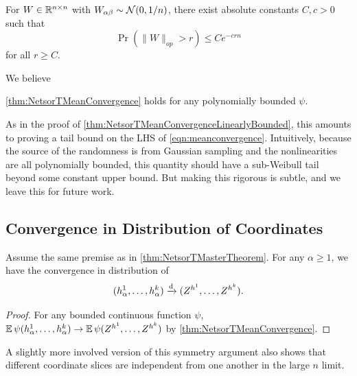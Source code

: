 \documentclass[main.tex]{subfiles}
\begin{document}
\begin{fact}\label{fact:opnormTailBound}
    For $W \in \mathbb{R}^{n \times n}$ with $W_{\alpha\beta}\sim\mathcal{N}(0, 1/n)$, there exist absolute constants $C, c > 0$ such that
    \[\Pr(\|W\|_{op} > r) \le C e^{-crn}\]
    for all $r \ge C$.
\end{fact}

We believe
\begin{conj}\label{conj:NetsorTMeanConvergence}
\cref{thm:NetsorTMeanConvergence} holds for any polynomially bounded $\psi$.
\end{conj}
As in the proof of \cref{thm:NetsorTMeanConvergenceLinearlyBounded}, this amounts to proving a tail bound on the LHS of \cref{eqn:meanconvergence}.
Intuitively, because the source of the randomness is from Gaussian sampling and the nonlinearities are all polynomially bounded, this quantity should have a sub-Weibull tail beyond some constant upper bound.
But making this rigorous is subtle, and we leave this for future work.

\subsection{Convergence in Distribution of Coordinates}

\begin{thm}
\label{thm:NetsorTConvergenceInDistribution}
Assume the same premise as in \cref{thm:NetsorTMasterTheorem}. 
For any $\alpha\ge1$, we have the convergence in distribution of
\[
(h_{\alpha}^{1},\ldots,h_{\alpha}^{k})\xrightarrow{\mathrm{d}}(Z^{h^{1}},\ldots,Z^{h^{k}}).
\]
\end{thm}

\begin{proof}
For any bounded continuous function $\psi$, $\operatorname*{\mathbb{E}}\psi(h_{\alpha}^{1},\ldots,h_{\alpha}^{k})\to\operatorname*{\mathbb{E}}\psi(Z^{h^{1}},\ldots,Z^{h^{k}})$ by \cref{thm:NetsorTMeanConvergence}.
\end{proof}
A slightly more involved version of this symmetry argument also shows that different coordinate slices are independent from one another in the large $n$ limit.
\end{document}
